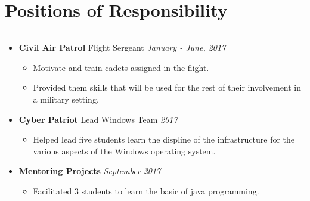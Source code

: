 \documentclass[a4paper]{article}
\begin{document}
\section*{Positions of Responsibility}
\hrule
\vspace{3mm}
\begin{itemize}
	\item
	      \textbf{Civil Air Patrol} Flight Sergeant
	      \hfill \textit{January - June, 2017}
	      \begin{itemize}
	      	\vspace{-2mm} \setlength\itemsep{-0.7mm}
		\item Motivate and train cadets assigned in the flight. 
		\item Provided them skills that will be used for the rest of their involvement in a military setting.
	      \end{itemize}
	\item
	      \textbf{Cyber Patriot} Lead Windows Team
	      \hfill \textit{2017}
	      \begin{itemize}
	      	\vspace{-2mm} \setlength\itemsep{-0.7mm}
		\item Helped lead five students learn the displine of the infrastructure for the various aspects of the Windows operating system.
	      \end{itemize}
	\item
	      \textbf{Mentoring Projects}
		  \hfill \textit{September 2017}
	      \begin{itemize}
	      	\vspace{-2mm} \setlength\itemsep{-0.7mm}
	      	\item Facilitated 3 students to learn the basic of java programming.
	      \end{itemize}
\end{itemize}

\end{document}
